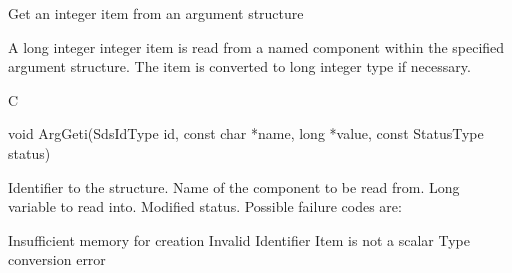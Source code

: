 \begin{manroutinedescription}
      Get an integer item from an argument structure

      A long integer integer item is read from a named component within the
      specified argument structure. The item is converted to long integer
      type if necessary.
 
      C

      void ArgGeti(SdsIdType id, const char *name, long *value, const %
StatusType {\mantt{*}} status)
 
\begin{manparametertable}
 Identifier to the structure.
 Name of the component to be read %
from.
 Long variable to read into.
 Modified status. Possible %
failure codes are:
\end{manparametertable}
\begin{mantwocolumntable}
Insufficient memory for creation
Invalid Identifier
Item is not a scalar
Type conversion error
\end{mantwocolumntable}
\end{manroutinedescription}
